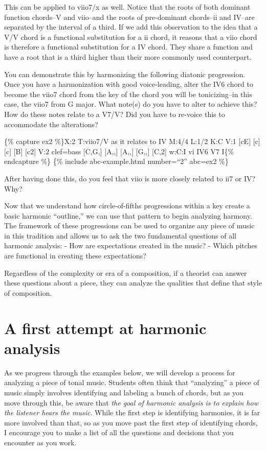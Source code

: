 \documentclass{book}
\begin{document}
This can be applied to viio7/x as well. Notice that the roots of both dominant
function chords--V and viio--and the roots of pre-dominant chords--ii and
IV--are separated by the interval of a third. If we add this observation to
the idea that a V/V chord is a functional substitution for a ii chord, it
reasons that a viio chord is therefore a functional substitution for a IV
chord. They share a function and have a root that is a third higher than their
more commonly used counterpart.

You can demonstrate this by harmonizing the following diatonic progression.
Once you have a harmonization with good voice-leading, alter the IV6 chord to
become the viio7 chord from the key of the chord you will be tonicizing--in
this case, the viio7 from G major. What note(s) do you have to alter to
achieve this? How do these notes relate to a V7/V? Did you have to re-voice
this to accommodate the alterations?

\{\% capture ex2 \%\}X:2 T:viio7/V as it relates to IV M:4/4 L:1/2 K:C V:1
{[}cE{]} {[}c{]}\textbar{} {[}c{]} {[}B{]}\textbar{} {[}c2{]}\textbar{]} V:2
clef=bass {[}C,G,{]} {[}A,,{]}\textbar{} {[}A,,{]} {[}G,,{]}\textbar{}
{[}C,2{]}\textbar{]} w:C:I vi IV6 V7 I\{\% endcapture \%\} \{\% include
abc-example.html number=``2'' abc=ex2 \%\}

After having done this, do you feel that viio is more closely related to ii7
or IV? Why?

Now that we understand how circle-of-fifths progressions within a key create a
basic harmonic ``outline,'' we can use that pattern to begin analyzing
harmony. The framework of these progressions can be used to organize any piece
of music in this tradition and allows us to ask the two fundamental questions
of all harmonic analysis: - How are expectations created in the music? - Which
pitches are functional in creating these expectations?

Regardless of the complexity or era of a composition, if a theorist can answer
these questions about a piece, they can analyze the qualities that define that
style of composition.

\hypertarget{a-first-attempt-at-harmonic-analysis}{%
\section{A first attempt at harmonic
analysis}\label{a-first-attempt-at-harmonic-analysis}}

As we progress through the examples below, we will develop a process for
analyzing a piece of tonal music. Students often think that ``analyzing'' a
piece of music simply involves identifying and labeling a bunch of chords, but
as you move through this, be aware that \emph{the goal of harmonic analysis is
to explain how the listener hears the music}. While the first step is
identifying harmonies, it is far more involved than that, so as you move past
the first step of identifying chords, I encourage you to make a list of all
the questions and decisions that you encounter as you work.
\end{document}
